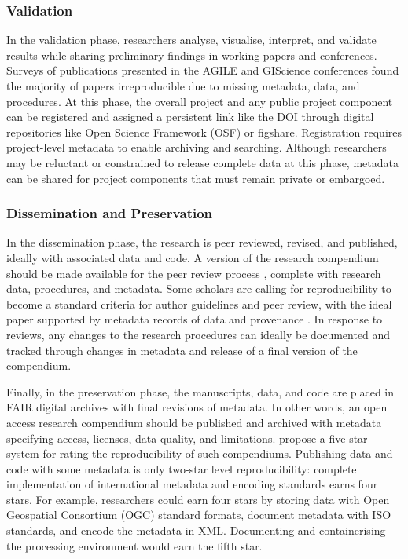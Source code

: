 \documentclass{isprs} %
\begin{document}
\subsubsection{Validation}

In the validation phase, researchers analyse, visualise, interpret, and validate results while sharing preliminary findings in working papers and conferences.
Surveys of publications presented in the AGILE \citep{Nust2018} and GIScience \citep{Ostermann2021}  conferences found the majority of papers irreproducible due to missing metadata, data, and procedures.
At this phase, the overall project and any public project component can be registered and assigned a persistent link like the DOI through digital repositories like Open Science Framework (OSF) or figshare.
Registration requires project-level metadata to enable archiving and searching.
Although researchers may be reluctant or constrained to release complete data at this phase, metadata can be shared for project components that must remain private or embargoed.

\subsubsection{Dissemination and Preservation}

In the dissemination phase, the research is peer reviewed, revised, and published, ideally with associated data and code.
A version of the research compendium should be made available for the peer review process \citep{Singleton2016}, complete with research data, procedures, and metadata.
Some scholars are calling for reproducibility to become a standard criteria for author guidelines and peer review, with the ideal paper supported by metadata records of data and provenance \citep{Gil2016,Nust2018}.
In response to reviews, any changes to the research procedures can ideally be documented and tracked through changes in metadata and release of a final version of the compendium.

Finally, in the preservation phase, the manuscripts, data, and code are placed in FAIR digital archives with final revisions of metadata.
In other words, an open access research compendium should be published and archived with metadata specifying access, licenses, data quality, and limitations. 
\citet{Wilson2021} propose a five-star system for rating the reproducibility of such compendiums.
Publishing data and code with some metadata is only two-star level reproducibility: complete implementation of international metadata and encoding standards earns four stars.
For example, researchers could earn four stars by storing data with Open Geospatial Consortium (OGC) standard formats, document metadata with ISO standards, and encode the metadata in XML.
Documenting and containerising the processing environment would earn the fifth star.
\end{document}
